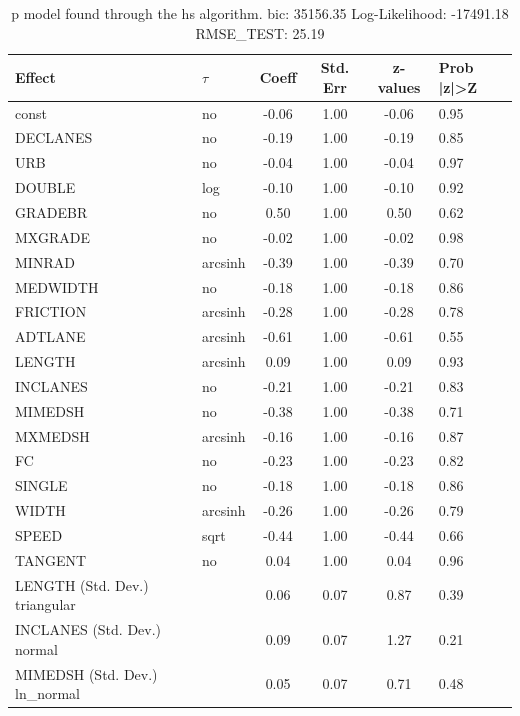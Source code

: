 \begin{table}
	\caption{p model found through the hs algorithm. bic: 35156.35 Log-Likelihood: -17491.18 RMSE_TEST: 25.19}
	\begin{center}
		\begin{tabular}{|l|l|c|c|c|l|}
			\hline
			Effect & $\tau$ & Coeff & Std. Err & z-values & Prob |z|>Z \\
			\hline
			const & no & -0.06 & 1.00 & -0.06 & 0.95 \\
			\hline
			DECLANES & no & -0.19 & 1.00 & -0.19 & 0.85 \\
			\hline
			URB & no & -0.04 & 1.00 & -0.04 & 0.97 \\
			\hline
			DOUBLE & log & -0.10 & 1.00 & -0.10 & 0.92 \\
			\hline
			GRADEBR & no & 0.50 & 1.00 & 0.50 & 0.62 \\
			\hline
			MXGRADE & no & -0.02 & 1.00 & -0.02 & 0.98 \\
			\hline
			MINRAD & arcsinh & -0.39 & 1.00 & -0.39 & 0.70 \\
			\hline
			MEDWIDTH & no & -0.18 & 1.00 & -0.18 & 0.86 \\
			\hline
			FRICTION & arcsinh & -0.28 & 1.00 & -0.28 & 0.78 \\
			\hline
			ADTLANE & arcsinh & -0.61 & 1.00 & -0.61 & 0.55 \\
			\hline
			LENGTH & arcsinh & 0.09 & 1.00 & 0.09 & 0.93 \\
			\hline
			INCLANES & no & -0.21 & 1.00 & -0.21 & 0.83 \\
			\hline
			MIMEDSH & no & -0.38 & 1.00 & -0.38 & 0.71 \\
			\hline
			MXMEDSH & arcsinh & -0.16 & 1.00 & -0.16 & 0.87 \\
			\hline
			FC & no & -0.23 & 1.00 & -0.23 & 0.82 \\
			\hline
			SINGLE & no & -0.18 & 1.00 & -0.18 & 0.86 \\
			\hline
			WIDTH & arcsinh & -0.26 & 1.00 & -0.26 & 0.79 \\
			\hline
			SPEED & sqrt & -0.44 & 1.00 & -0.44 & 0.66 \\
			\hline
			TANGENT & no & 0.04 & 1.00 & 0.04 & 0.96 \\
			\hline
			LENGTH (Std. Dev.) triangular &  & 0.06 & 0.07 & 0.87 & 0.39 \\
			\hline
			INCLANES (Std. Dev.) normal &  & 0.09 & 0.07 & 1.27 & 0.21 \\
			\hline
			MIMEDSH (Std. Dev.) ln_normal &  & 0.05 & 0.07 & 0.71 & 0.48 \\

\end{tabular}
\end{center}
\end{table}
